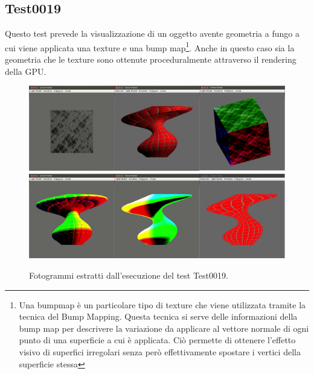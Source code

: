 \subsection{Test0019}
Questo test prevede la visualizzazione di un oggetto avente geometria a fungo a cui viene applicata una texture e una bump map\footnote{Una bumpmap \`e un particolare tipo di texture che viene utilizzata tramite la tecnica del Bump Mapping. Questa tecnica si serve delle informazioni della bump map per descrivere la variazione da applicare al vettore normale di ogni punto di una superficie a cui \`e applicata. Ci\`o permette di ottenere l'effetto visivo di superfici irregolari senza per\`o effettivamente spostare i vertici della superficie stessa}. Anche in questo caso sia la geometria che le texture sono ottenute proceduralmente attraverso il rendering della \ac{GPU}.
\begin{figure}%
\begin{center}
\includegraphics[width=\textwidth]{Immagini/test0019/test0019-wall1}
\includegraphics[width=\textwidth]{Immagini/test0019/test0019-wall2}
\caption{Fotogrammi estratti dall'esecuzione del test Test0019. \label{f:test0019-wall}} 
\end{center} 
\end{figure}

